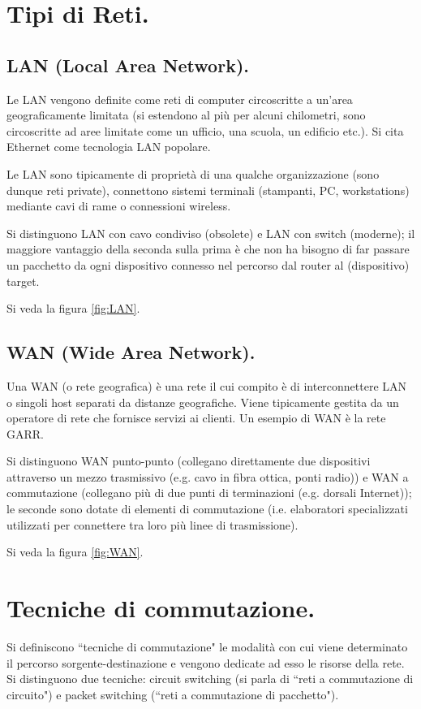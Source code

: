 \documentclass[11pt, italian, openany]{book}
\begin{document}
\begin{sloppypar}
\section{Tipi di Reti.}
\subsection{LAN (Local Area Network).}
Le LAN vengono definite come reti di computer circoscritte a un'area geograficamente limitata (si estendono al pi\`u per alcuni chilometri,
sono circoscritte ad aree limitate come un ufficio, una scuola, un edificio etc.). Si cita Ethernet come tecnologia LAN popolare.

Le LAN sono tipicamente di propriet\`a di una qualche organizzazione (sono dunque reti private), connettono sistemi terminali (stampanti, PC,
workstations) mediante cavi di rame o connessioni wireless.

Si distinguono LAN con cavo condiviso (obsolete) e LAN con switch (moderne); il maggiore vantaggio della seconda sulla prima \`e che non ha
bisogno di far passare un pacchetto da ogni dispositivo connesso nel percorso dal router al (dispositivo) target.

Si veda la figura \ref{fig:LAN}.

\subsection{WAN (Wide Area Network).}
Una WAN (o rete geografica) \`e una rete il cui compito \`e di interconnettere LAN o singoli host separati da distanze geografiche. Viene
tipicamente gestita da un operatore di rete che fornisce servizi ai clienti. Un esempio di WAN \`e la rete GARR.

Si distinguono WAN punto-punto (collegano direttamente due dispositivi attraverso un mezzo trasmissivo (e.g. cavo in fibra ottica, ponti radio))
e WAN a commutazione (collegano pi\`u di due punti di terminazioni (e.g. dorsali Internet)); le seconde sono dotate di elementi di commutazione
(i.e. elaboratori specializzati utilizzati per connettere tra loro pi\`u linee di trasmissione).

Si veda la figura \ref{fig:WAN}.

\section{Tecniche di commutazione.}
Si definiscono ``tecniche di commutazione" le modalit\`a con cui viene determinato il percorso sorgente-destinazione e vengono dedicate ad esso le
risorse della rete. Si distinguono due tecniche: circuit switching (si parla di ``reti a commutazione di circuito") e packet switching (``reti a
commutazione di pacchetto").


\end{sloppypar}
\end{document}
